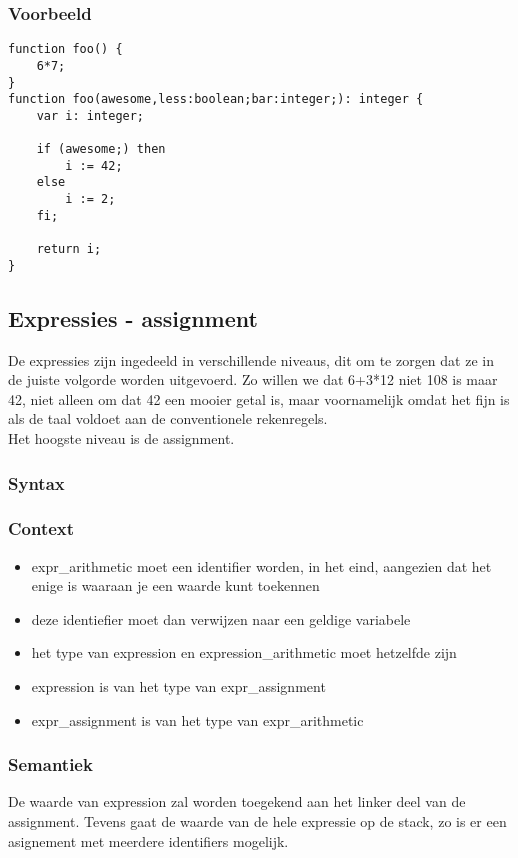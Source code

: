 \documentclass[]{article}
\begin{document}
\subsubsection{Voorbeeld}
\begin{lstlisting}[style=SELMA]
function foo() {
	6*7;
}
function foo(awesome,less:boolean;bar:integer;): integer {
	var i: integer;
	
	if (awesome;) then
		i := 42;
	else
		i := 2;
	fi;
	
	return i;
}
\end{lstlisting}


\subsection{Expressies - assignment}
De expressies zijn ingedeeld in verschillende niveaus, dit om te zorgen dat ze in de juiste volgorde worden uitgevoerd. Zo willen we dat 6+3*12 niet 108 is maar 42, niet alleen om dat 42 een mooier getal is, maar voornamelijk omdat het fijn is als de taal voldoet aan de conventionele rekenregels. \\
Het hoogste niveau is de assignment.
\subsubsection{Syntax}

\subsubsection{Context}
\begin{itemize}
\item expr\_arithmetic moet een identifier worden, in het eind, aangezien dat het enige is waaraan je een waarde kunt toekennen
\item deze identiefier moet dan verwijzen naar een geldige variabele
\item het type van expression en expression\_arithmetic moet hetzelfde zijn
\item expression is van het type van expr\_assignment
\item expr\_assignment is van het type van expr\_arithmetic 
\end{itemize}
\subsubsection{Semantiek}
De waarde van expression zal worden toegekend aan het linker deel van de assignment.
Tevens gaat de waarde van de hele expressie op de stack, zo is er een asignement met meerdere identifiers mogelijk.
\end{document}
